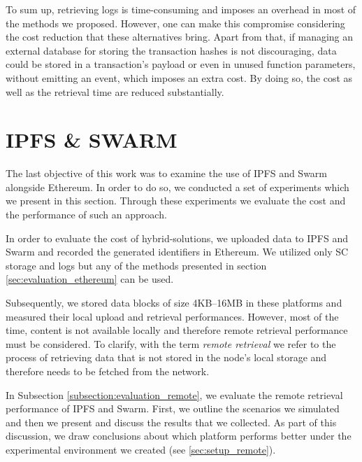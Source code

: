 To sum up, retrieving logs is time-consuming and imposes an overhead in most of the methods we proposed. However, one can make this compromise considering the cost reduction that these alternatives bring. Apart from that, if managing an external database for storing the transaction hashes is not discouraging, data could be stored in a transaction’s payload or even in unused function parameters, without emitting an event, which imposes an extra cost. By doing so, the cost as well as the retrieval time are reduced substantially.

\section{IPFS \& SWARM}\label{sec:evaluation_dfs}
The last objective of this work was to examine the use of IPFS and Swarm alongside Ethereum. In order to do so, we conducted a set of experiments which we present in this section. Through these experiments we evaluate the cost and the performance of such an approach.

In order to evaluate the cost of hybrid-solutions, we uploaded data to IPFS and Swarm and recorded the generated identifiers in Ethereum. We utilized only SC storage and logs but any of the methods presented in section \ref{sec:evaluation_ethereum} can be used. 

Subsequently, we stored data blocks of size 4KB–16MB in these platforms and measured their local upload and retrieval performances. However, most of the time, content is not available locally and therefore remote retrieval performance must be considered. To clarify, with the term \textit{remote retrieval} we refer to the process of retrieving data that is not stored in the node's local storage and therefore needs to be fetched from the network.

In Subsection \ref{subsection:evaluation_remote}, we evaluate the remote retrieval performance of IPFS and Swarm. First, we outline the scenarios we simulated and then we present and discuss the results that we collected. As part of this discussion, we draw conclusions about which platform performs better under the experimental environment we created (see \ref{sec:setup_remote}).

 
